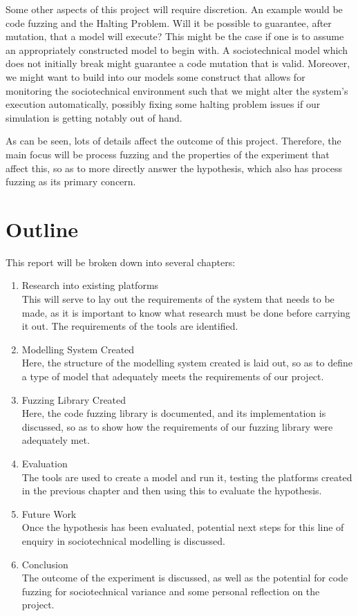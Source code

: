 Some other aspects of this project will require discretion. An example would be code fuzzing and the Halting Problem. Will it be possible to guarantee, after mutation, that a model will execute? This might be the case if one is to assume an appropriately constructed model to begin with. A sociotechnical model which does not initially break might guarantee a code mutation that is valid. Moreover, we might want to build into our models some construct that allows for monitoring the sociotechnical environment such that we might alter the system's execution automatically, possibly fixing some halting problem issues if our simulation is getting notably out of hand. \par%

As can be seen, lots of details affect the outcome of this project. Therefore, the main focus will be process fuzzing and the properties of the experiment that affect this, so as to more directly answer the hypothesis, which also has process fuzzing as its primary concern. \par%


\section{Outline}
\label{outline}
This report will be broken down into several chapters: 
\begin{enumerate}[start=3]
    \item Research into existing platforms\hfill \\
        This will serve to lay out the requirements of the system that needs to be made, as it is important to know what research must be done before carrying it out. The requirements of the tools are identified. 
    \item Modelling System Created\hfill \\
        Here, the structure of the modelling system created is laid out, so as to define a type of model that adequately meets the requirements of our project.
    \item Fuzzing Library Created\hfill \\
        Here, the code fuzzing library is documented, and its implementation is discussed, so as to show how the requirements of our fuzzing library were adequately met.
    \item Evaluation\hfill \\
        The tools are used to create a model and run it, testing the platforms created in the previous chapter and then using this to evaluate the hypothesis.
    \item Future Work\hfill \\
        Once the hypothesis has been evaluated, potential next steps for this line of enquiry in sociotechnical modelling is discussed.
    \item Conclusion\hfill \\
        The outcome of the experiment is discussed, as well as the potential for code fuzzing for sociotechnical variance and some personal reflection on the project.
\end{enumerate}